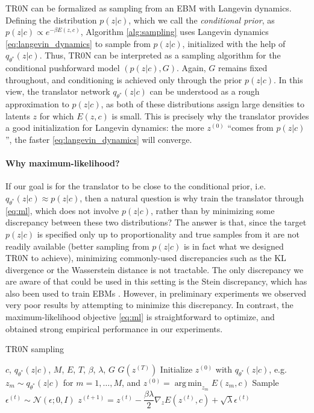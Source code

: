 \documentclass[nohyperref]{article}
\DeclareMathOperator*{\argmin}{arg\,min}
\theoremstyle{plain}
\theoremstyle{definition}
\theoremstyle{remark}
\begin{document}
TR0N can be formalized as sampling from an EBM with Langevin dynamics. Defining the distribution $p(z|c)$, which we call the \emph{conditional prior}, as $p(z|c) \propto e^{-\beta E(z, c)}$, Algorithm \ref{alg:sampling} uses Langevin dynamics \eqref{eq:langevin_dynamics} to sample from $p(z|c)$, initialized with the help of $q_{\theta^*}(z|c)$. Thus, TR0N can be interpreted as a sampling algorithm for the conditional pushforward model $(p(z|c), G)$. Again, $G$ remains fixed throughout, and conditioning is achieved only through the prior $p(z|c)$. 
In this view, the translator network $q_{\theta^*}(z|c)$ can be understood as a rough approximation to $p(z|c)$, as both of these distributions assign large densities to latents $z$ for which $E(z, c)$ is small. This is precisely why the translator provides a good initialization for Langevin dynamics: the more $z^{(0)}$ ``comes from $p(z|c)$'', the faster \eqref{eq:langevin_dynamics} will converge.

\paragraph{Why maximum-likelihood?} If our goal is for the translator to be close to the conditional prior, i.e.\ $q_{\theta^*}(z|c) \approx p(z|c)$, then a natural question is why train the translator through \eqref{eq:ml}, which does not involve $p(z|c)$, rather than by minimizing some discrepancy between these two distributions? The answer is that, since the target $p(z|c)$ is specified only up to proportionality and true samples from it are not readily available (better sampling from $p(z|c)$ is in fact what we designed TR0N to achieve), minimizing commonly-used discrepancies such as the KL divergence or the Wasserstein distance is not tractable. The only discrepancy we are aware of that could be used in this setting is the Stein discrepancy, which has also been used to train EBMs \citep{grathwohl2020learning}. However, in preliminary experiments we observed very poor results by attempting to minimize this discrepancy. In contrast, the maximum-likelihood objective \eqref{eq:ml} is straightforward to optimize, and obtained strong empirical performance in our experiments.

\begin{algorithm}[t]
   \caption{TR0N sampling}
   \label{alg:sampling}
\begin{algorithmic}
    $c$, $q_{\theta^*}(z|c)$, $M$, $E$, $T$, $\beta$, $\lambda$, $G$
    $G(z^{(T)})$
   \STATE Initialize $z^{(0)}$ with $q_{\theta^*}(z|c)$, e.g.\ $z_m \sim q_{\theta^*}(z|c)$ for $m=1,\dots, M$, and $z^{(0)} = \displaystyle \argmin_{z_m} E(z_m, c)$
   \STATE Sample $\epsilon^{(t)} \sim \mathcal{N}(\epsilon; 0, I)$
   \STATE $z^{(t+1)} = z^{(t)} - \dfrac{\beta \lambda}{2} \nabla_z E \left(z^{(t)}, c\right) + \sqrt{\lambda}\epsilon^{(t)}$
   \ENDFOR
\end{algorithmic}
\end{algorithm}
\end{document}
